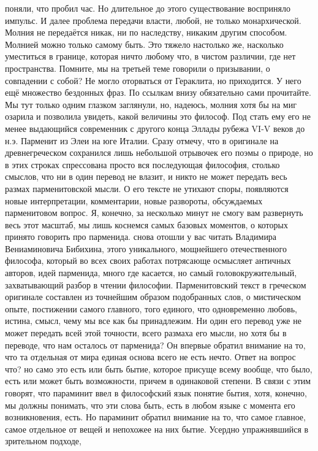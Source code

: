 поняли, что пробил час. Но длительное до этого существование восприняло импульс.
И далее проблема передачи власти, любой, не только монархической. Молния не
передаётся никак, ни по наследству, никаким другим способом. Молнией можно
только самому быть. Это тяжело настолько же, насколько уместиться в границе,
которая ничто любому что, в чистом различии, где нет пространства. Помните, мы
на третьей теме говорили о призывании, о совпадении с собой? Не могло оторваться
от Гераклита, но приходится. У него ещё множество бездонных фраз. По ссылкам
внизу обязательно сами прочитайте. Мы тут только одним глазком заглянули, но,
надеюсь, молния хотя бы на миг озарила и позволила увидеть, какой величины это
философ. Под стать ему его не менее выдающийся современник с другого конца
Эллады рубежа VI-V веков до н.э. Парменит из Элеи на юге Италии. Сразу отмечу,
что в оригинале на древнегреческом сохранился лишь небольшой отрывочек его поэмы
о природе, но в этих строках спрессована просто вся последующая философия,
столько смыслов, что ни в один перевод не влазит, и никто не может передать весь
размах парменитовской мысли. О его тексте не утихают споры, появляются новые
интерпретации, комментарии, новые развороты, обсуждаемых парменитовом вопрос. Я,
конечно, за несколько минут не смогу вам развернуть весь этот масштаб, мы лишь
коснемся самых базовых моментов, о которых принято говорить про парменида. снова
отошли у вас читать Владимира Вениаминовича Бибихина, этого уникального,
мощнейшего отечественного философа, который во всех своих работах потрясающе
осмысляет античных авторов, идей парменида, много где касается, но самый
головокружительный, захватывающий разбор в чтении философии. Парменитовский
текст в греческом оригинале составлен из точнейшим образом подобранных слов, о
мистическом опыте, постижении самого главного, того единого, что одновременно
любовь, истина, смысл, чему мы все как бы принадлежим. Ни один его перевод уже
не может передать всей этой точности, всего размаха его мысли, но хотя бы в
переводе, что нам осталось от парменида? Он впервые обратил внимание на то, что
та отдельная от мира единая основа всего не есть нечто. Ответ на вопрос что? но
само это есть или быть бытие, которое присуще всему вообще, что было, есть или
может быть возможности, причем в одинаковой степени. В связи с этим говорят, что
параминит ввел в философский язык понятие бытия, хотя, конечно, мы должны
понимать, что эти слова быть, есть в любом языке с момента его возникновения,
есть. Но параминит обратил внимание на то, что самое главное, самое отдельное от
вещей и непохожее на них бытие. Усердно упражнявшийся в зрительном подходе,
